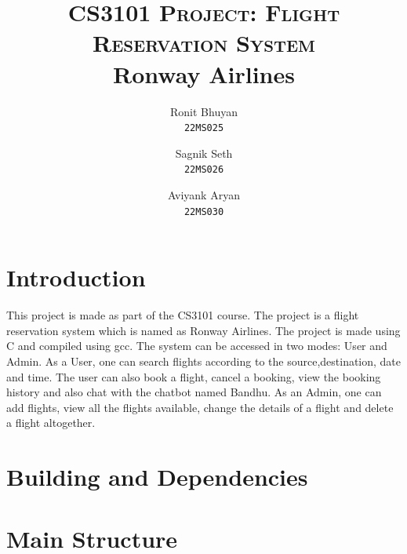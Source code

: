 \documentclass[a4paper]{scrartcl}
\title{
        \Large\textsc{CS3101 Project: Flight Reservation System} \\
        \vspace{10pt}
        \Huge\textbf{Ronway Airlines} \\
}
\author{Ronit Bhuyan \\ \texttt{22MS025} \and Sagnik Seth \\ \texttt{22MS026} \and   Aviyank Aryan \\ \texttt{22MS030}}
\date{}
\begin{document}
\maketitle
\tableofcontents
\section{Introduction}
This project is made as part of the CS3101 course. The project is a flight reservation system which is named as Ronway Airlines. The project is made using C and compiled using gcc. The system can be accessed in two modes: User and Admin. As a User, one can search flights according to the source,destination, date and time. The user can also book a flight, cancel a booking, view the booking history and also chat with the chatbot named Bandhu. As an Admin, one can add flights, view all the flights available, change the details of a flight and delete a flight altogether.
\section{Building and Dependencies}
\section{Main Structure}
\end{document}
